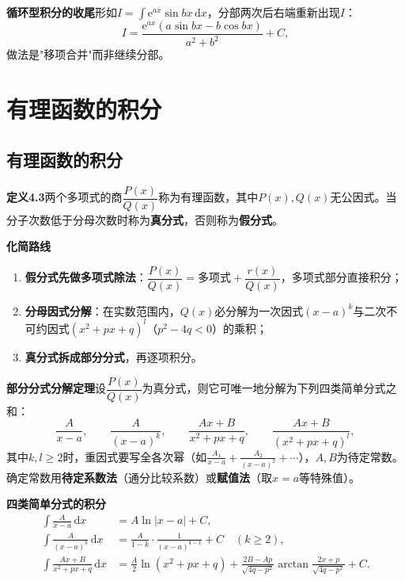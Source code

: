 \noindent\textbf{循环型积分的收尾}\quad 形如$I=\int \mathrm{e}^{ax}\sin bx\,\mathrm{d}x$，分部两次后右端重新出现$I$：
\[
I=\frac{\mathrm{e}^{ax}(a\sin bx-b\cos bx)}{a^2+b^2}+C ,
\]
做法是"移项合并"而非继续分部。


\section{有理函数的积分}

\subsection{有理函数的积分}

\noindent\textbf{定义4.3}\quad 两个多项式的商$\dfrac{P(x)}{Q(x)}$称为有理函数，其中$P(x),Q(x)$无公因式。当分子次数低于分母次数时称为\textbf{真分式}，否则称为\textbf{假分式}。

\noindent\textbf{化简路线}
\begin{enumerate}
  \item \textbf{假分式先做多项式除法}：$\dfrac{P(x)}{Q(x)}=\text{多项式}+\dfrac{r(x)}{Q(x)}$，多项式部分直接积分；
  \item \textbf{分母因式分解}：在实数范围内，$Q(x)$必分解为一次因式$(x-a)^k$与二次不可约因式$(x^2+px+q)^l$（$p^2-4q<0$）的乘积；
  \item \textbf{真分式拆成部分分式}，再逐项积分。
\end{enumerate}

\noindent\textbf{部分分式分解定理}\quad 设$\dfrac{P(x)}{Q(x)}$为真分式，则它可唯一地分解为下列四类简单分式之和：
\[
\frac{A}{x-a},\qquad \frac{A}{(x-a)^k},\qquad \frac{Ax+B}{x^2+px+q},\qquad \frac{Ax+B}{(x^2+px+q)^l},
\]
其中$k,l\ge2$时，重因式要写全各次幂（如$\frac{A_1}{x-a}+\frac{A_2}{(x-a)^2}+\cdots$），$A,B$为待定常数。确定常数用\textbf{待定系数法}（通分比较系数）或\textbf{赋值法}（取$x=a$等特殊值）。

\noindent\textbf{四类简单分式的积分}
\begin{align*}
\int\frac{A}{x-a}\,\mathrm{d}x &= A\ln|x-a|+C,\\
\int\frac{A}{(x-a)^k}\,\mathrm{d}x &= \frac{A}{1-k}\cdot\frac{1}{(x-a)^{k-1}}+C\quad(k\ge2),\\
\int\frac{Ax+B}{x^2+px+q}\,\mathrm{d}x &= \frac{A}{2}\ln(x^2+px+q)+\frac{2B-Ap}{\sqrt{4q-p^2}}\arctan\frac{2x+p}{\sqrt{4q-p^2}}+C .
\end{align*}

